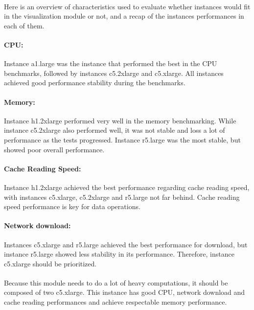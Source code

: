 \documentclass[11pt]{article}
\begin{document}
		\paragraph{} Here is an overview of characteristics used to evaluate
		whether instances would fit in the visualization module or not, and a
		recap of the instances performances in each of them.

		\paragraph{CPU:} Instance a1.large was the instance that performed the
		best in the CPU benchmarks, followed by instances c5.2xlarge and
		c5.xlarge. All instances achieved good performance stability during
		the benchmarks.

		\paragraph{Memory:} Instance h1.2xlarge performed very well in the
		memory benchmarking. While instance c5.2xlarge also performed well, it
		was not stable and loss a lot of performance as the tests progressed.
		Instance r5.large was the most stable, but showed poor overall
		performance.

		\paragraph{Cache Reading Speed:} Instance h1.2xlarge achieved the best
		performance regarding cache reading speed, with instances c5.xlarge,
		c5.2xlarge and r5.large not far behind. Cache reading speed performance
		is key for data operations.

		\paragraph{Network download:} Instances c5.xlarge and r5.large achieved
		the best performance for download, but instance r5.large showed less
		stability in its performance. Therefore, instance c5.xlarge should be
		prioritized. 
		
		\paragraph{} Because this module needs to do a lot of heavy
		computations, it should be composed of two c5.xlarge. This instance has
		good CPU, network download and cache reading performances and achieve
		respectable memory performance. \bigskip
		
\end{document}
